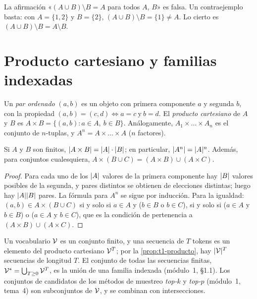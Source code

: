 \begin{ejemplo}
La afirmación «$(A\cup B)\setminus B=A$ para todos $A$, $B$» es falsa. Un contraejemplo basta: con $A=\{1,2\}$ y $B=\{2\}$, $(A\cup B)\setminus B=\{1\}\neq A$. Lo cierto es $(A\cup B)\setminus B=A\setminus B$.
\end{ejemplo}

\section{Producto cartesiano y familias indexadas}

\begin{definicion}
Un \emph{par ordenado} $(a,b)$ es un objeto con primera componente $a$ y segunda $b$, con la propiedad $(a,b)=(c,d)\iff a=c\ \text{y}\ b=d$. El \emph{producto cartesiano} de $A$ y $B$ es $A\times B=\{(a,b): a\in A,\ b\in B\}$. Análogamente, $A_1\times\dots\times A_n$ es el conjunto de $n$-tuplas, y $A^{n}=A\times\dots\times A$ ($n$ factores).
\end{definicion}

\begin{proposicion}\label{prop:t1-producto}
Si $A$ y $B$ son finitos, $\lvert A\times B\rvert=\lvert A\rvert\cdot\lvert B\rvert$; en particular, $\lvert A^{n}\rvert=\lvert A\rvert^{n}$. Además, para conjuntos cualesquiera, $A\times(B\cup C)=(A\times B)\cup(A\times C)$.
\end{proposicion}

\begin{proof}
Para cada uno de los $\lvert A\rvert$ valores de la primera componente hay $\lvert B\rvert$ valores posibles de la segunda, y pares distintos se obtienen de elecciones distintas; luego hay $\lvert A\rvert\lvert B\rvert$ pares. La fórmula para $A^{n}$ se sigue por inducción. Para la igualdad: $(a,b)\in A\times(B\cup C)$ si y solo si $a\in A$ y ($b\in B$ o $b\in C$), si y solo si ($a\in A$ y $b\in B$) o ($a\in A$ y $b\in C$), que es la condición de pertenencia a $(A\times B)\cup(A\times C)$.
\end{proof}

\begin{observacion}
Un vocabulario $\mathcal{V}$ es un conjunto finito, y una secuencia de $T$ tokens es un elemento del producto cartesiano $\mathcal{V}^{T}$; por la \cref{prop:t1-producto}, hay $\lvert\mathcal{V}\rvert^{T}$ secuencias de longitud $T$. El conjunto de todas las secuencias finitas, $\mathcal{V}^{*}=\bigcup_{T\ge 0}\mathcal{V}^{T}$, es la unión de una familia indexada (módulo~1, §1.1). Los conjuntos de candidatos de los métodos de muestreo \emph{top-$k$} y \emph{top-$p$} (módulo~1, tema~4) son subconjuntos de $\mathcal{V}$, y se combinan con intersecciones.
\end{observacion}

